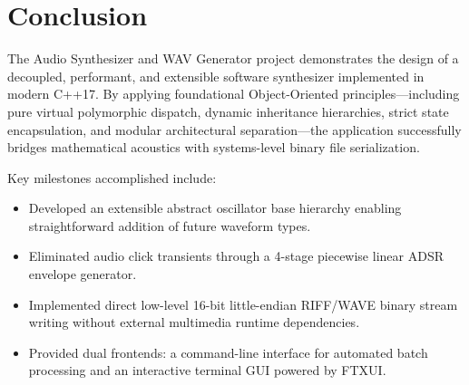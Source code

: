 \documentclass[12pt,a4paper,oneside]{book}
\begin{document}
\section{Conclusion}
The Audio Synthesizer and WAV Generator project demonstrates the design of a decoupled, performant, and extensible software synthesizer implemented in modern C++17. By applying foundational Object-Oriented principles—including pure virtual polymorphic dispatch, dynamic inheritance hierarchies, strict state encapsulation, and modular architectural separation—the application successfully bridges mathematical acoustics with systems-level binary file serialization.

Key milestones accomplished include:
\begin{itemize}
    \item Developed an extensible abstract oscillator base hierarchy enabling straightforward addition of future waveform types.
    \item Eliminated audio click transients through a 4-stage piecewise linear ADSR envelope generator.
    \item Implemented direct low-level 16-bit little-endian RIFF/WAVE binary stream writing without external multimedia runtime dependencies.
    \item Provided dual frontends: a command-line interface for automated batch processing and an interactive terminal GUI powered by FTXUI.
\end{itemize}
\end{document}
